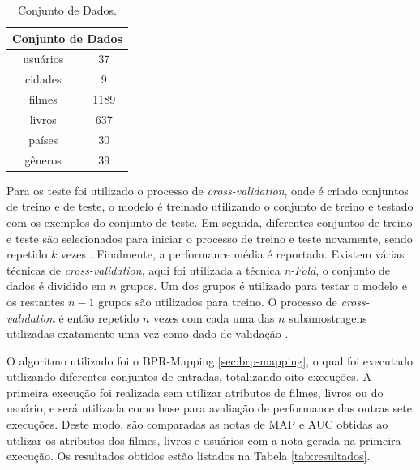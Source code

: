 \begin{table}[]
	\centering
	\caption{Conjunto de Dados.}
	\label{tab:conjunto-dados}
	\begin{tabular}{|c|c|}
		\hline
		\multicolumn{2}{|c|}{\textbf{Conjunto de Dados}} \\ \hline
		usuários                  & 37                   \\ \hline
		cidades                   & 9                    \\ \hline
		filmes                    & 1189                 \\ \hline
		livros                    & 637                  \\ \hline
		países                    & 30                   \\ \hline
		gêneros                   & 39                   \\ \hline
	\end{tabular}
\end{table}


Para os teste foi utilizado o processo de \textit{cross-validation}, onde é criado conjuntos de treino e de teste, o modelo é treinado utilizando o conjunto de treino e testado com os exemplos do conjunto de teste. Em seguida, diferentes conjuntos de treino e teste são selecionados para iniciar o processo de treino e teste novamente, sendo repetido $k$ vezes \citep{ricci2011recommender}. Finalmente, a performance média é reportada. Existem várias técnicas de \textit{cross-validation}, aqui foi utilizada a técnica \textit{n-Fold}, o conjunto de dados é dividido em $n$ grupos. Um dos grupos é utilizado para testar o modelo e os restantes $n-1$ grupos são utilizados para treino. O processo de \textit{cross-validation} é então repetido $n$ vezes com cada uma das $n$ subamostragens utilizadas exatamente uma vez como dado de validação \citep{ricci2011recommender}.

O algoritmo utilizado foi o BPR-Mapping \ref{sec:brp-mapping}, o qual foi executado utilizando diferentes conjuntos de entradas, totalizando oito execuções. A primeira execução foi realizada sem utilizar atributos de filmes, livros ou do usuário, e será utilizada como base para avaliação de performance das outras sete execuções. Deste modo, são comparadas as notas de \ac{MAP} e \ac{AUC} obtidas ao utilizar os atributos dos filmes, livros e usuários com a nota gerada na primeira execução. Os resultados obtidos estão listados na Tabela \ref{tab:resultados}.





